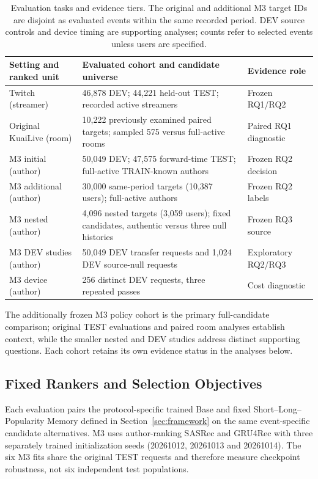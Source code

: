 \begin{table}[t]
\centering
\caption{Evaluation tasks and evidence tiers. The original and additional M3 target IDs are disjoint as evaluated events within the same recorded period. DEV source controls and device timing are supporting analyses; counts refer to selected events unless users are specified.}
\label{tab:exp-datasets}
\footnotesize
\setlength{\tabcolsep}{5pt}
\begin{tabularx}{\textwidth}{@{}>{\raggedright\arraybackslash}p{2.65cm}X>{\raggedright\arraybackslash}p{2.50cm}@{}}
\toprule
Setting and ranked unit & Evaluated cohort and candidate universe & Evidence role \\
\midrule
Twitch (streamer) & 46,878 DEV; 44,221 held-out TEST; recorded active streamers & Frozen RQ1/RQ2 \\
Original KuaiLive (room) & 10,222 previously examined paired targets; sampled 575 versus full-active rooms & Paired RQ1 diagnostic \\
M3 initial (author) & 50,049 DEV; 47,575 forward-time TEST; full-active TRAIN-known authors & Frozen RQ2 decision \\
M3 additional (author) & 30,000 same-period targets (10,387 users); full-active authors & Frozen RQ2 labels \\
M3 nested (author) & 4,096 nested targets (3,059 users); fixed candidates, authentic versus three null histories & Frozen RQ3 source \\
M3 DEV studies (author) & 50,049 DEV transfer requests and 1,024 DEV source-null requests & Exploratory RQ2/RQ3 \\
M3 device (author) & 256 distinct DEV requests, three repeated passes & Cost diagnostic \\
\bottomrule
\end{tabularx}
\end{table}

The additionally frozen M3 policy cohort is the primary full-candidate comparison; original TEST evaluations and paired room analyses establish context, while the smaller nested and DEV studies address distinct supporting questions. Each cohort retains its own evidence status in the analyses below.

\subsection{Fixed Rankers and Selection Objectives}
\label{sec:exp-comparators}

Each evaluation pairs the protocol-specific trained Base and fixed Short--Long--Popularity Memory defined in Section~\ref{sec:framework} on the same event-specific candidate alternatives. M3 uses author-ranking SASRec and GRU4Rec with three separately trained initialization seeds (20261012, 20261013 and 20261014). The six M3 fits share the original TEST requests and therefore measure checkpoint robustness, not six independent test populations.

